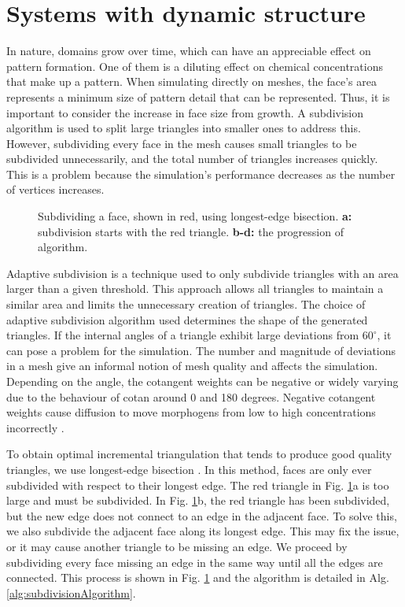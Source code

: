 \section{Systems with dynamic structure}
In nature, domains grow over time, which can have an appreciable effect on pattern formation. One of them is a diluting effect on chemical concentrations that make up a pattern. When simulating directly on meshes, the face's area represents a minimum size of pattern detail that can be represented. Thus, it is important to consider the increase in face size from growth. A subdivision algorithm is used to split large triangles into smaller ones to address this. However, subdividing every face in the mesh causes small triangles to be subdivided unnecessarily, and the total number of triangles increases quickly. This is a problem because the simulation's performance decreases as the number of vertices increases. 

\begin{figure}[H]
	\centering
	\caption[Subdividing a face, shown in red, using longest-edge bisection]{Subdividing a face, shown in red, using longest-edge bisection. \textbf{a:} subdivision starts with the red triangle. \textbf{b-d:} the progression of algorithm.} 
	\label{fig:recursiveSubdiv}
\end{figure}

Adaptive subdivision is a technique used to only subdivide triangles with an area larger than a given threshold. This approach allows all triangles to maintain a similar area and limits the unnecessary creation of triangles. The choice of adaptive subdivision algorithm used determines the shape of the generated triangles. If the internal angles of a triangle exhibit large deviations from $60^{\circ}$, it can pose a problem for the simulation. The number and magnitude of deviations in a mesh give an informal notion of mesh quality and affects the simulation. Depending on the angle, the cotangent weights can be negative or widely varying due to the behaviour of cotan around 0 and 180 degrees. Negative cotangent weights cause diffusion to move morphogens from low to high concentrations incorrectly \citep{wardetzky2007}. 

To obtain optimal incremental triangulation that tends to produce good quality triangles, we use longest-edge bisection \citep{rivara1998}. In this method, faces are only ever subdivided with respect to their longest edge. The red triangle in Fig. \ref{fig:recursiveSubdiv}a is too large and must be subdivided. In Fig. \ref{fig:recursiveSubdiv}b, the red triangle has been subdivided, but the new edge does not connect to an edge in the adjacent face. To solve this, we also subdivide the adjacent face along its longest edge. This may fix the issue, or it may cause another triangle to be missing an edge. We proceed by subdividing every face missing an edge in the same way until all the edges are connected. This process is shown in Fig. \ref{fig:recursiveSubdiv} and the algorithm is detailed in Alg. \ref{alg:subdivisionAlgorithm}. 

